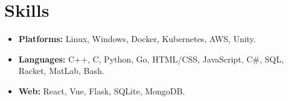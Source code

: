 \section*{Skills}
\begin{itemize}
    \item 
    \textbf{Platforms:} Linux, Windows, Docker, Kubernetes, AWS, Unity.
    \item 
    \textbf{Languages:} C++, C, Python, Go, HTML/CSS, JavaScript, C\#, SQL, Racket, MatLab, Bash.
    \item 
    \textbf{Web:} React, Vue, Flask, SQLite, MongoDB.
\end{itemize}
